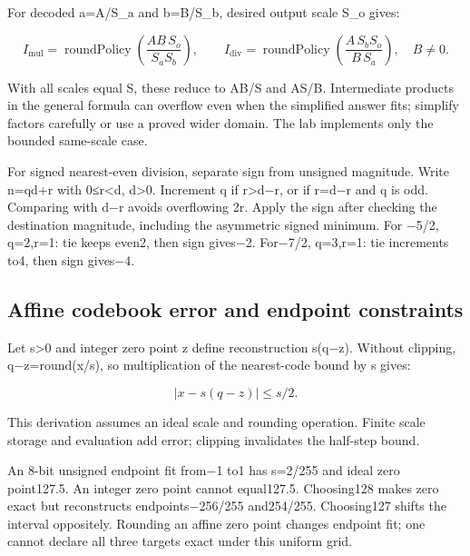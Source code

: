\hypertarget{01-foundations-i-ch011-different-operand-scales-require-an-explicit-output-scale}{}

For decoded a=A/S\_a and b=B/S\_b, desired output scale S\_o gives:

\[
I_{\mathrm{mul}}=\operatorname{roundPolicy}
  \left(\frac{AB\,S_o}{S_aS_b}\right),
\qquad
I_{\mathrm{div}}=\operatorname{roundPolicy}
  \left(\frac{A\,S_bS_o}{B\,S_a}\right),\quad B\ne0.
\]

With all scales equal S, these reduce to AB/S and AS/B. Intermediate products in the general formula can overflow even when the simplified answer fits; simplify factors carefully or use a proved wider domain. The lab implements only the bounded same-scale case.

For signed nearest-even division, separate sign from unsigned magnitude. Write n=qd+r with 0≤r\textless d, d\textgreater0. Increment q if r\textgreater d−r, or if r=d−r and q is odd. Comparing with d−r avoids overflowing 2r. Apply the sign after checking the destination magnitude, including the asymmetric signed minimum. For −5/2, q=2,r=1: tie keeps even2, then sign gives−2. For−7/2, q=3,r=1: tie increments to4, then sign gives−4.

\subsection{Affine codebook error and endpoint constraints}\label{01-foundations-i-ch011-affine-codebook-error-and-endpoint-constraints}

\hypertarget{01-foundations-i-ch011-affine-codebook-error-and-endpoint-constraints}{}

Let s\textgreater0 and integer zero point z define reconstruction s(q−z). Without clipping, q−z=round(x/s), so multiplication of the nearest-code bound by s gives:

\[
\left|x-s(q-z)\right|\le s/2.
\]

This derivation assumes an ideal scale and rounding operation. Finite scale storage and evaluation add error; clipping invalidates the half-step bound.

An 8-bit unsigned endpoint fit from−1 to1 has s=2/255 and ideal zero point127.5. An integer zero point cannot equal127.5. Choosing128 makes zero exact but reconstructs endpoints−256/255 and254/255. Choosing127 shifts the interval oppositely. Rounding an affine zero point changes endpoint fit; one cannot declare all three targets exact under this uniform grid.

